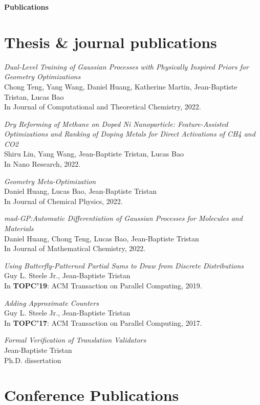 \documentclass[margin,line]{res}
\begin{document}
\begin{resume}
\newpage
  {\bf {\Large Publications}}

\section{\sc Thesis \& journal publications}

\emph{Dual-Level Training of Gaussian Processes with Physically Inspired Priors for Geometry Optimizations}\\
Chong Teng, Yang Wang, Daniel Huang, Katherine Martin, Jean-Baptiste Tristan, Lucas Bao\\
In Journal of Computational and Theoretical Chemistry, 2022.

\emph{Dry Reforming of Methane on Doped Ni Nanoparticle:
  Feature-Assisted Optimizations and Ranking of Doping Metals for
  Direct Activations of CH4 and CO2}\\
Shiru Lin, Yang Wang, Jean-Baptiste Tristan, Lucas Bao\\
In Nano Research, 2022.

\emph{Geometry Meta-Optimization}\\
Daniel Huang, Lucas Bao, Jean-Baptiste Tristan\\
In Journal of Chemical Physics, 2022.

\emph{mad-GP:Automatic Differentiation of Gaussian Processes for Molecules and Materials}\\
Daniel Huang, Chong Teng, Lucas Bao, Jean-Baptiste Tristan\\
In Journal of Mathematical Chemistry, 2022.

\emph{Using Butterfly-Patterned Partial Sums to Draw from Discrete Distributions}\\
Guy L. Steele Jr., Jean-Baptiste Tristan\\
In {\bf TOPC'19}: ACM Transaction on Parallel Computing, 2019.

\emph{Adding Approximate Counters}\\
Guy L. Steele Jr., Jean-Baptiste Tristan\\
In {\bf TOPC'17}: ACM Transaction on Parallel Computing, 2017.

\emph{Formal Verification of Translation Validators}\\
Jean-Baptiste Tristan\\
Ph.D. dissertation

\section{\sc Conference Publications}


\end{resume}
\end{document}
